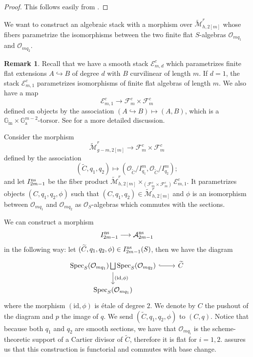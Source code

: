\documentclass{alggeom}
\numberwithin{equation}{section}
\numberwithin{subsection}{section}
\theoremstyle{definition}
\newtheorem{remark}[theorem]{Remark}
\theoremstyle{remark}
\newcommand\cA{\mathcal{A}} \newcommand\cB{\mathcal{B}}
\newcommand\cE{\mathcal{E}} \newcommand\cF{\mathcal{F}}
\newcommand\cO{\mathcal{O}} \newcommand\cP{\mathcal{P}}
\newcommand\GG{\mathbb{G}} \newcommand\HH{\mathbb{H}}
\newcommand\rma{\mathrm{a}} \newcommand\rmb{\mathrm{b}}
\newcommand\rmm{\mathrm{m}} \newcommand\rmn{\mathrm{n}}
\newcommand\into{\hookrightarrow}
\newcommand\spec{\operatorname{Spec}}
\newcommand\id{\mathrm{id}}
\newcommand{\gm}{\GG_{\rmm}}
\newcommand{\ga}{\GG_{\rma}}
\newcommand{\Mtilde}{\widetilde{\mathcal M}}
\begin{document}
\begin{proof}
	This follows easily from . 
\end{proof}

We want to construct an algebraic stack with a morphism over $\Mtilde_{h,2[m]}^r$ whose fibers parametrize the isomorphisms between the two finite flat $S$-algebras $\cO_{mq_1}$ and $\cO_{mq_2}$.

\begin{remark}
	Recall that we have a smooth stack $\cE_{m,d}^c$ which parametrizes finite flat extensions $A\into B$ of degree $d$ with $B$ curvilinear of length $m$. If $d=1$, the stack $\cE_{m,1}^c$ parametrizes isomorphisms of finite flat algebras of length $m$. We also have a map 
	$$ \cE_{m,1}^c \longrightarrow \cF_m^c \times \cF_m^c$$ 
	defined on objects by the association $(A\into B) \mapsto (A,B)$, which is a $\gm \times \ga^{m-2}$-torsor. See  for a more detailed discussion.
\end{remark}

Consider the morphism
$$\Mtilde_{g-m,2[m]}^r \longrightarrow \cF_{m}^c \times \cF_m^c$$
defined by the association 
$$(\widetilde{C},q_1,q_2)\mapsto (\cO_{\widetilde{C}}/I_{q_1}^m,\cO_{\widetilde{C}}/I_{q_2}^m);$$
and let $I_{2m-1}^{\rm ns}$ be the fiber product $\Mtilde_{h,2[m]}^r \times_{(\cF_{m}^c\times\cF_{m}^c)} \cE_{m,1}^c$. It parametrizes objects $(C,q_1,q_2,\phi)$ such that $(C,q_1,q_2) \in \Mtilde_{h,2[m]}^r$ and $\phi$ is an isomorphism between $\cO_{mq_1}$ and $\cO_{mq_2}$ as $\cO_S$-algebras which commutes with the sections.

We can construct a morphism 
$$ I_{2m-1}^{\rm ns} \longrightarrow \cA_{2m-1}^{\rm ns}$$ 
in the following way: let $(\widetilde{C},q_1,q_2,\phi) \in I_{2m-1}^{\rm ns}(S)$, then we have the diagram
$$
\begin{tikzcd}
	\spec_S(\cO_{mq_1})\bigsqcup \spec_S(\cO_{mq_2}) \arrow[d, "{(\id,\phi)}"] \arrow[r, hook] & \widetilde{C} \\
	\spec_S(\cO_{mq_1})                                                                     &              
\end{tikzcd}
$$
where the morphism $(\id,\phi)$ is \'etale of degree $2$. We denote by $C$ the pushout of the diagram and $p$ the image of $q$. We send $(\widetilde{C},q_1,q_2,\phi)$ to $(C,q)$. Notice that because both $q_1$ and $q_2$ are smooth sections, we have that $\cO_{mq_i}$ is the scheme-theoretic support of a Cartier divisor of $\widetilde{C}$, therefore it is flat for $i=1,2$.  assures us that this construction is functorial and commutes with base change. 
\end{document}
